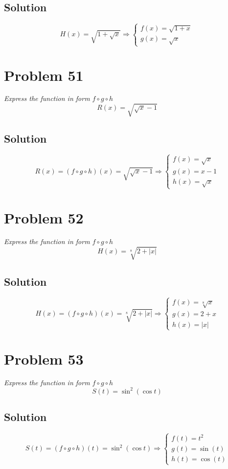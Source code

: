 \documentclass[11pt]{article}
\newcommand{\soln}{\subsection*}
\newcommand{\qn}{\textit}
\begin{document}
\soln{Solution}
\begin{equation*}
	H(x)=\sqrt{1+\sqrt{x}}
	\Rightarrow
	\begin{cases}
		f(x) = \sqrt{1+x} \\
		g(x) = \sqrt{x}
	\end{cases}
\end{equation*}

\section*{Problem 51}

\qn{Express the function in form $f \circ g \circ h$ $$R(x)=\sqrt{\sqrt{x}-1}$$}

\soln{Solution}
\begin{equation*}
	R(x)=(f \circ g \circ h)(x)=\sqrt{\sqrt{x}-1}
	\Rightarrow
	\begin{cases}
		f(x) = \sqrt{x} \\
		g(x) = x-1 \\
		h(x) = \sqrt{x}
	\end{cases}
\end{equation*}

\section*{Problem 52}

\qn{Express the function in form $f \circ g \circ h$ $$H(x)=\sqrt[8]{2+|x|}$$}

\soln{Solution}
\begin{equation*}
	H(x)=(f \circ g \circ h)(x)=\sqrt[8]{2+|x|}
	\Rightarrow
	\begin{cases}
		f(x) = \sqrt[8]{x} \\
		g(x) = 2+x \\
		h(x) = |x|
	\end{cases}
\end{equation*}

\section*{Problem 53}

\qn{Express the function in form $f \circ g \circ h$ $$S(t)=\sin^2(\cos{t})$$}

\soln{Solution}
\begin{equation*}
	S(t)=(f \circ g \circ h)(t)=\sin^2(\cos{t})
	\Rightarrow
	\begin{cases}
		f(t) = t^2 \\
		g(t) = \sin(t) \\
		h(t) = \cos(t)
	\end{cases}
\end{equation*}
\end{document}
